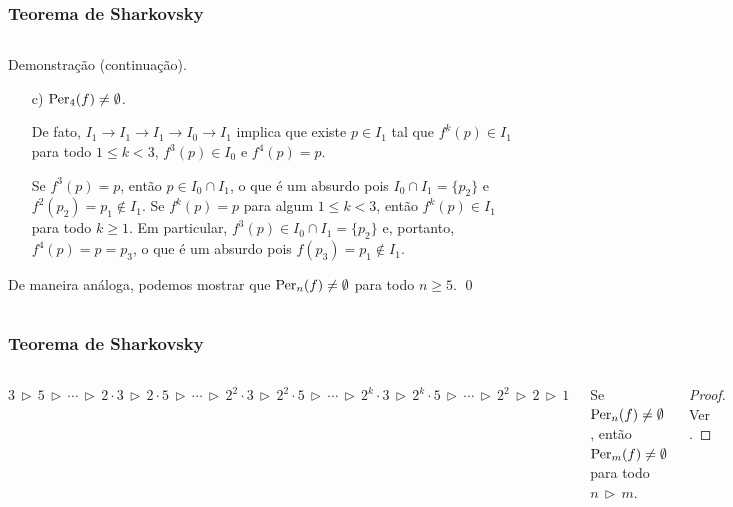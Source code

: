 \begin{frame}
\vspace{5pt}
\frametitle{Teorema de Sharkovsky}
\begin{columns}
\column{\dimexpr\paperwidth-15pt}

\begin{block}{Demonstração (continuação).}
\begin{enumerate}
\item[c)] \textit{$\operatorname{Per}_4(f) \neq \emptyset$.}

De fato, $I_1 \longrightarrow I_1 \longrightarrow I_1 \longrightarrow I_0 \longrightarrow I_1$ implica que existe $p \in I_1$ tal que $f^k(p) \in I_1$ para todo $1 \leq k < 3$, $f^3(p) \in I_0$ e $f^4(p) = p$.

Se $f^3(p) = p$, então $p \in I_0 \cap I_1$, o que é um absurdo pois $I_0 \cap I_1 = \lbrace p_2 \rbrace$ e $f^2(p_2) = p_1 \notin I_1$.
Se $f^k(p) = p$ para algum $1 \leq k < 3$, então $f^k(p) \in I_1$ para todo $k \geq 1$.
Em particular, $f^3(p) \in I_0 \cap I_1 = \lbrace p_2 \rbrace$ e, portanto, $f^4(p) = p = p_3$, o que é um absurdo pois $f(p_3) = p_1 \notin I_1$.
\end{enumerate}
De maneira análoga, podemos mostrar que $\operatorname{Per}_n(f) \neq \emptyset$ para todo $n \geq 5$.
\qed
\end{block}

\end{columns}
\end{frame}


\begin{frame}
\vspace{5pt}
\frametitle{Teorema de Sharkovsky}
\begin{columns}
\column{\dimexpr\paperwidth-15pt}

\begin{definition}
$3 \, \triangleright \, 5 
\, \triangleright \, \cdots \, \triangleright \,
2 \cdot 3 \, \triangleright \, 2 \cdot 5 
\, \triangleright \, \cdots \, \triangleright \,
2^2 \cdot 3 \, \triangleright \, 2^2 \cdot 5
\, \triangleright \, \cdots \, \triangleright \,
2^k \cdot 3 \, \triangleright \, 2^k \cdot 5
\, \triangleright \, \cdots \, \triangleright \,
2^2 \, \triangleright \, 2 \, \triangleright \, 1$
\end{definition}
\vspace{15pt}
\begin{theorem}[Sharkovsky]
Se $\operatorname{Per}_n(f) \neq \emptyset$, então $\operatorname{Per}_m(f) \neq \emptyset$ para todo $n \, \triangleright \, m$.
\end{theorem}

\begin{proof}
Ver \cite{burns}.
\end{proof}

\end{columns}
\end{frame}

